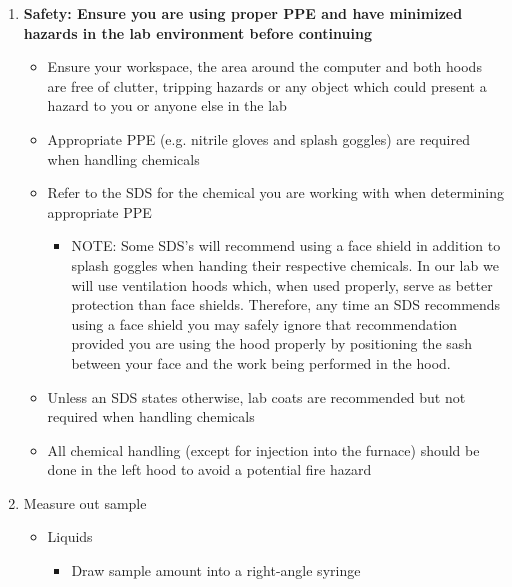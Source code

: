 \documentclass[letterpaper,11pt]{article}
\begin{document}
\begin{enumerate}
    \item \textbf{Safety: Ensure you are using proper PPE and have minimized 
        hazards in the lab environment before continuing}
            
            \begin{itemize}
            \item Ensure your workspace, the area around the computer and 
                both hoods are free of clutter, tripping hazards or any object 
                which could present a hazard to you or anyone else in the lab
            \item Appropriate PPE (e.g. nitrile gloves and splash goggles) are 
                required when handling chemicals
            \item Refer to the SDS for the chemical you are working 
                with when determining appropriate PPE
                \begin{itemize}
                \item NOTE: Some SDS's will recommend using a face shield in 
                    addition to splash goggles when handing their respective 
                    chemicals. In our lab we will use ventilation hoods which, 
                    when used properly, serve as better protection than face 
                    shields. Therefore, any time an SDS recommends using a 
                    face shield you may safely ignore that recommendation 
                    provided you are using the hood properly by positioning the 
                    sash between your face and the work being performed in 
                    the hood.
                \end{itemize}
                
            \item Unless an SDS states otherwise, lab coats are recommended but 
                not required when handling chemicals
            \item All chemical handling (except for injection into the furnace) 
                should be done in the left hood to avoid a potential fire hazard 
            \end{itemize}
    

    \item Measure out sample
        \begin{itemize}
        \item Liquids
            \begin{itemize}
            \item Draw sample amount into a right-angle syringe            
            \end{itemize}
        

\end{itemize}
\end{enumerate}
\end{document}
